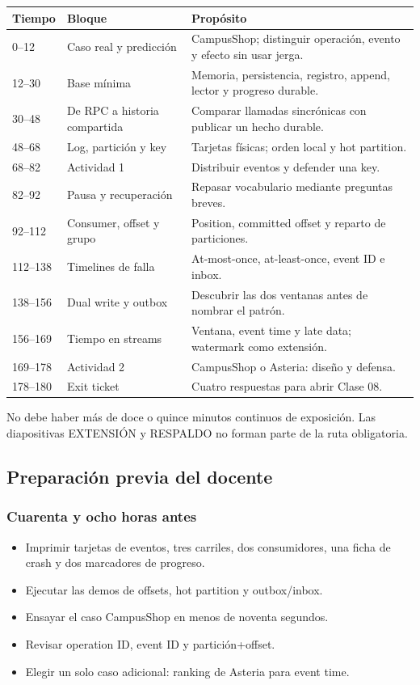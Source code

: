 \documentclass[variant=docente,cover=institutional,mode=screen]{ua-engineering-v6-article}
\begin{document}
\begin{center}
\begin{tabular}{p{}p{}p{}}
\toprule
Tiempo & Bloque & Propósito \\
\midrule
0--12 & Caso real y predicción & CampusShop; distinguir operación, evento y efecto sin usar jerga. \\
12--30 & Base mínima & Memoria, persistencia, registro, append, lector y progreso durable. \\
30--48 & De RPC a historia compartida & Comparar llamadas sincrónicas con publicar un hecho durable. \\
48--68 & Log, partición y key & Tarjetas físicas; orden local y hot partition. \\
68--82 & Actividad 1 & Distribuir eventos y defender una key. \\
82--92 & Pausa y recuperación & Repasar vocabulario mediante preguntas breves. \\
92--112 & Consumer, offset y grupo & Position, committed offset y reparto de particiones. \\
112--138 & Timelines de falla & At-most-once, at-least-once, event ID e inbox. \\
138--156 & Dual write y outbox & Descubrir las dos ventanas antes de nombrar el patrón. \\
156--169 & Tiempo en streams & Ventana, event time y late data; watermark como extensión. \\
169--178 & Actividad 2 & CampusShop o Asteria: diseño y defensa. \\
178--180 & Exit ticket & Cuatro respuestas para abrir Clase 08. \\
\bottomrule
\end{tabular}
\end{center}

No debe haber más de doce o quince minutos continuos de exposición. Las diapositivas EXTENSIÓN y RESPALDO no forman parte de la ruta obligatoria.

\subsection{Preparación previa del docente}

\subsubsection*{Cuarenta y ocho horas antes}
\begin{itemize}
\item Imprimir tarjetas de eventos, tres carriles, dos consumidores, una ficha de crash y dos marcadores de progreso.
\item Ejecutar las demos de offsets, hot partition y outbox/inbox.
\item Ensayar el caso CampusShop en menos de noventa segundos.
\item Revisar operation ID, event ID y partición+offset.
\item Elegir un solo caso adicional: ranking de Asteria para event time.
\end{itemize}
\end{document}
